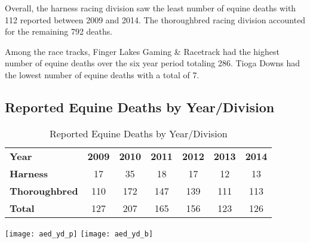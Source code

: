 \documentclass[oneside]{article}
\begin{document}
Overall, the harness racing division saw the least number of equine deaths with 112 reported between 2009 and 2014. The thoroughbred racing division accounted for the remaining 792 deaths.

Among the race tracks, Finger Lakes Gaming \& Racetrack had the highest number of equine deaths over the six year period totaling 286. Tioga Downs had the lowest number of equine deaths with a total of 7.

\newpage
\subsection{Reported Equine Deaths by Year/Division}
\begin{table}[h]
\centering
\caption{Reported Equine Deaths by Year/Division}
\label{my-label}
\begin{tabular}{|lcccccc|}
\hline
{\bf Year}         & {\bf 2009} & {\bf 2010} & {\bf 2011} & {\bf 2012} & {\bf 2013} & {\bf 2014} \\
{\bf Harness}      & 17         & 35         & 18         & 17         & 12         & 13         \\
{\bf Thoroughbred} & 110        & 172        & 147        & 139        & 111        & 113        \\
{\bf Total}        & 127        & 207        & 165        & 156        & 123        & 126        \\ \hline
\end{tabular}
\end{table}

\texttt{[image: aed\_yd\_p]}
\texttt{[image: aed\_yd\_b]}

\newpage
\end{document}
